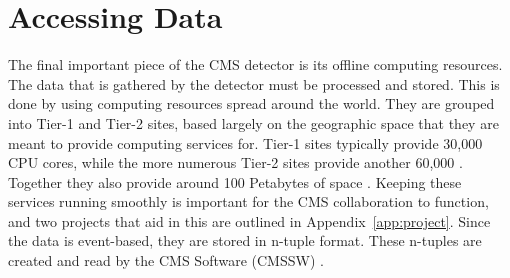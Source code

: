 \section{Accessing Data} \label{sec:accessing-data}

The final important piece of the CMS detector is its offline computing resources.
The data that is gathered by the detector must be processed and stored.
This is done by using computing resources spread around the world.
They are grouped into Tier-1 and Tier-2 sites,
based largely on the geographic space that they are meant to provide computing services for.
Tier-1 sites typically provide 30,000 CPU cores, while the more numerous Tier-2 sites provide
another 60,000 \cite{Bloom_2017}.
Together they also provide around 100 Petabytes of space \cite{Ratnikova_2014}.
Keeping these services running smoothly is important for the CMS collaboration to function,
and two projects that aid in this are outlined in Appendix~\ref{app:project}.
Since the data is event-based, they are stored in n-tuple format.
These n-tuples are created and read by the CMS Software (CMSSW) \cite{INNOCENTE200131}.
